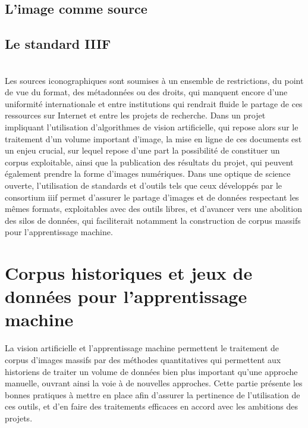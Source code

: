 \documentclass[a4paper,12pt,twoside]{book}
\newcommand{\iiif}{\gls{iiif}\xspace}
\newcommand{\clearemptydoublepage}{\newpage{\pagestyle{empty}\cleardoublepage}}
\begin{document}
            \section{L’image comme source}
                
        
            \section{\label{stardardIiif}Le standard IIIF}
                
        	\\
        
        Les sources iconographiques sont soumises à un ensemble de restrictions, du point de vue du format, des métadonnées ou des droits, qui manquent encore d'une uniformité internationale et entre institutions qui rendrait fluide le partage de ces ressources sur Internet et entre les projets de recherche. Dans un projet impliquant l'utilisation d'algorithmes de vision artificielle, qui repose alors sur le traitement d'un volume important d'image, la mise en ligne de ces documents est un enjeu crucial, sur lequel repose d'une part la possibilité de constituer un corpus exploitable, ainsi que la publication des résultats du projet, qui peuvent également prendre la forme d'images numériques. Dans une optique de science ouverte, l'utilisation de standards et d'outils tels que ceux développés par le consortium \iiif permet d'assurer le partage d'images et de données respectant les mêmes formats, exploitables avec des outils libres, et d'avancer vers une abolition des silos de données, qui faciliterait notamment la construction de corpus massifs pour l'apprentissage machine. 
        \clearemptydoublepage
        
        \chapter[Corpus historiques et jeux de données]{Corpus historiques et jeux de données pour l’apprentissage machine}
        La vision artificielle et l'apprentissage machine permettent le traitement de corpus d'images massifs par des méthodes quantitatives qui permettent aux historiens de traiter un volume de données bien plus important qu'une approche manuelle, ouvrant ainsi la voie à de nouvelles approches. Cette partie présente les bonnes pratiques à mettre en place afin d'assurer la pertinence de l'utilisation de ces outils, et d'en faire des traitements efficaces en accord avec les ambitions des projets.
    
\end{document}
